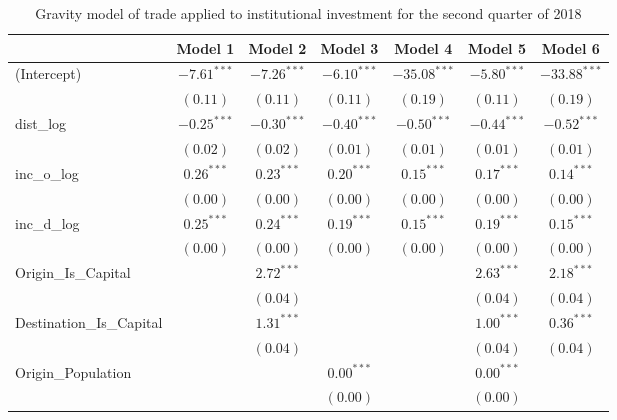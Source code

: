 \begin{table}
	\begin{center}
		\small
		\caption[Gravity Model of Trade for Q2 2018]{Gravity model of trade applied to institutional investment for the second quarter of 2018}
		\begin{tabular}{l c c c c c c }
			\hline
			& Model 1 & Model 2 & Model 3 & Model 4 & Model 5 & Model 6 \\
			\hline
			(Intercept)                  & $-7.61^{***}$ & $-7.26^{***}$ & $-6.10^{***}$ & $-35.08^{***}$ & $-5.80^{***}$ & $-33.88^{***}$ \\
			& $(0.11)$      & $(0.11)$      & $(0.11)$      & $(0.19)$       & $(0.11)$      & $(0.19)$       \\
			dist\_log                    & $-0.25^{***}$ & $-0.30^{***}$ & $-0.40^{***}$ & $-0.50^{***}$  & $-0.44^{***}$ & $-0.52^{***}$  \\
			& $(0.02)$      & $(0.02)$      & $(0.01)$      & $(0.01)$       & $(0.01)$      & $(0.01)$       \\
			inc\_o\_log                  & $0.26^{***}$  & $0.23^{***}$  & $0.20^{***}$  & $0.15^{***}$   & $0.17^{***}$  & $0.14^{***}$   \\
			& $(0.00)$      & $(0.00)$      & $(0.00)$      & $(0.00)$       & $(0.00)$      & $(0.00)$       \\
			inc\_d\_log                  & $0.25^{***}$  & $0.24^{***}$  & $0.19^{***}$  & $0.15^{***}$   & $0.19^{***}$  & $0.15^{***}$   \\
			& $(0.00)$      & $(0.00)$      & $(0.00)$      & $(0.00)$       & $(0.00)$      & $(0.00)$       \\
			Origin\_Is\_Capital          &               & $2.72^{***}$  &               &                & $2.63^{***}$  & $2.18^{***}$   \\
			&               & $(0.04)$      &               &                & $(0.04)$      & $(0.04)$       \\
			Destination\_Is\_Capital     &               & $1.31^{***}$  &               &                & $1.00^{***}$  & $0.36^{***}$   \\
			&               & $(0.04)$      &               &                & $(0.04)$      & $(0.04)$       \\
			Origin\_Population           &               &               & $0.00^{***}$  &                & $0.00^{***}$  &                \\
			&               &               & $(0.00)$      &                & $(0.00)$      &                \\

\end{tabular}
\end{center}
\end{table}
